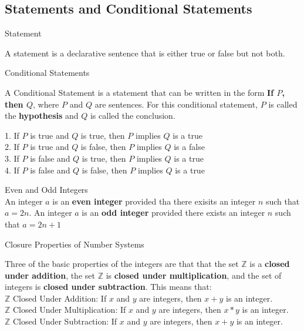 \subsection{Statements and Conditional Statements}
\begin{definition}
Statement

A statement is a declarative sentence that is either true or false but not both. \\
\end{definition}

\begin{definition}
Conditional Statements

A Conditional Statement is a statement that can be written in the form {\bf If $P$, then $Q$}, where $P$ and $Q$ are sentences. For this conditional statement, $P$ is called the {\bf hypothesis} and $Q$ is called the conclusion. \\

\begin{minipage}{1\textwidth}
1. If $P$ is true and $Q$ is true, then $P$ implies $Q$ is a true \\
2. If $P$ is true and $Q$ is false, then $P$ implies $Q$ is a false \\
3. If $P$ is false and $Q$ is true, then $P$ implies $Q$ is a true \\
4. If $P$ is false and $Q$ is false, then $P$ implies $Q$ is a true \\
\end{minipage}
\end{definition}

\begin{definition}
Even and Odd Integers \\

An integer $a$ is an {\bf even integer} provided tha there exisits an integer $n$ such that $a = 2n$. An integer $a$ is an {\bf odd integer} provided there exists an integer $n$ such that $a = 2n + 1$
\end{definition}


\begin{definition}
Closure Properties of Number Systems

Three of the basic properties of the integers are that that the set $\mathbb{Z}$ is a {\bf closed under addition}, the set $\mathbb{Z}$ is {\bf closed under multiplication}, and the set of integers is {\bf closed under subtraction}. This means that: \\

$\mathbb{Z}$ Closed Under Addition: If $x$ and $y$ are integers, then $x+y$ is an integer. \\
 
$\mathbb{Z}$ Closed Under Multiplication: If $x$ and $y$ are integers, then $x*y$ is an integer. \\

$\mathbb{Z}$ Closed Under Subtraction: If $x$ and $y$ are integers, then $x+y$ is an integer. \\

\end{definition}

